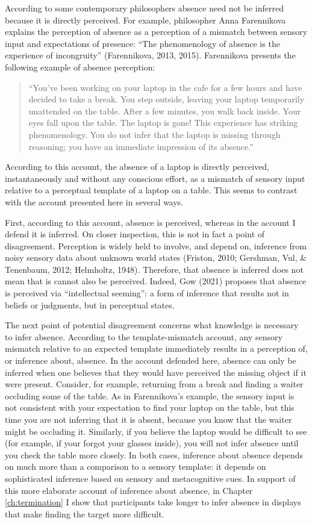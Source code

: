 \documentclass[12pt,twoside]{reedthesis}
\begin{document}
According to some contemporary philosophers absence need not be inferred because it is directly perceived. For example, philosopher Anna Farennikova explains the perception of absence as a perception of a mismatch between sensory input and expectations of presence: ``The phenomenology of absence is the experience of incongruity'' (Farennikova, 2013, 2015). Farennikova presents the following example of absence perception:
\begin{quote}
``You've been working on your laptop in the cafe for a few hours and have decided to take a break. You step outside, leaving your laptop temporarily unattended on the table. After a few minutes, you walk back inside. Your eyes fall upon the table. The laptop is gone! This experience has striking phenomenology. You do not infer that the laptop is missing through reasoning; you have an immediate impression of its absence.''
\end{quote}
According to this account, the absence of a laptop is directly perceived, instantaneously and without any conscious effort, as a mismatch of sensory input relative to a perceptual template of a laptop on a table. This seems to contrast with the account presented here in several ways.

First, according to this account, absence is perceived, whereas in the account I defend it is inferred. On closer inspection, this is not in fact a point of disagreement. Perception is widely held to involve, and depend on, inference from noisy sensory data about unknown world states (Friston, 2010; Gershman, Vul, \& Tenenbaum, 2012; Helmholtz, 1948). Therefore, that absence is inferred does not mean that is cannot also be perceived. Indeed, Gow (2021) proposes that absence is perceived via ``intellectual seeming'': a form of inference that results not in beliefs or judgments, but in perceptual states.

The next point of potential disagreement concerns what knowledge is necessary to infer absence. According to the template-mismatch account, any sensory mismatch relative to an expected template immediately results in a perception of, or inference about, absence. In the account defended here, absence can only be inferred when one believes that they would have perceived the missing object if it were present. Consider, for example, returning from a break and finding a waiter occluding some of the table. As in Farennikova's example, the sensory input is not consistent with your expectation to find your laptop on the table, but this time you are not inferring that it is absent, because you know that the waiter might be occluding it. Similarly, if you believe the laptop would be difficult to see (for example, if your forgot your glasses inside), you will not infer absence until you check the table more closely. In both cases, inference about absence depends on much more than a comparison to a sensory template: it depends on sophisticated inference based on sensory and metacognitive cues. In support of this more elaborate account of inference about absence, in Chapter \ref{ch:termination} I show that participants take longer to infer absence in displays that make finding the target more difficult.
\end{document}
